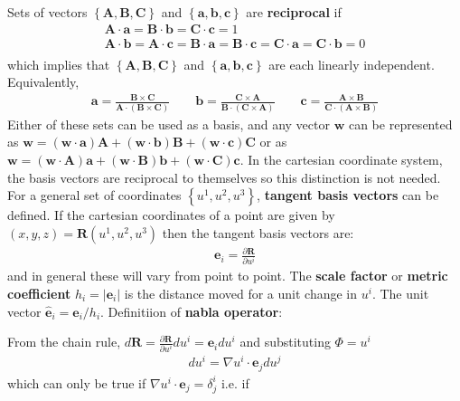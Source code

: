 \documentclass[12pt]{article}
\def\L{\left}
\def\R{\right}
\newcommand{\ve}[1]{\ensuremath{\boldsymbol{#1}}}
\newcommand{\hv}[1]{\hat{\ve{#1}}}
\newcommand{\bvec}{\ve{b}}
\newcommand{\Bvec}{\ve{B}}
\begin{document}
Sets of vectors $\L\{\mathbf{A, B, C}\R\}$ and $\L\{\mathbf{a, b,
c}\R\}$ are {\bf reciprocal} if
%
\begin{align*}
\mathbf{A\cdot a} = \mathbf{B\cdot b} = \mathbf{C\cdot c} = 1\\ \mathbf{A\cdot
b} = \mathbf{A\cdot c} = \mathbf{B\cdot a} = \mathbf{B\cdot c} = \mathbf{C\cdot
a} = \mathbf{C\cdot b} = 0 \\
\end{align*}
%
which implies that $\L\{\mathbf{A, B, C}\R\}$ and $\L\{\mathbf{a, b,
c}\R\}$ are each linearly independent.  Equivalently,
%
\begin{align*}
\mathbf{a} = \frac{\mathbf{B\times C}}{\mathbf{A\cdot\L(B\times
C\R)}}\qquad \bvec = \frac{\mathbf{C\times A}}{\mathbf{B\cdot\L(C\times
A\R)}}\qquad \mathbf{c} = \frac{\mathbf{A\times
B}}{\mathbf{C\cdot\L(A\times B\R)}}
\end{align*}
%
Either of these sets can be used as a basis, and any vector $\mathbf{w}$ can be
represented as $\mathbf{w} = \L(\mathbf{w\cdot a}\R)\mathbf{A} +
\L(\mathbf{w\cdot b}\R)\Bvec + \L(\mathbf{w\cdot c}\R)\mathbf{C}$
or as $\mathbf{w} = \L(\mathbf{w\cdot A}\R)\mathbf{a} +
\L(\mathbf{w\cdot B}\R)\bvec + \L(\mathbf{w\cdot
C}\R)\mathbf{c}$. In the cartesian coordinate system, the basis vectors are
reciprocal to themselves so this distinction is not needed.  For a general set
of coordinates $\L\{u^1, u^2, u^3\R\}$, {\bf tangent basis vectors} can
be defined. If the cartesian coordinates of a point are given by $\L(x, y,
z\R) = \mathbf{R}\L(u^1, u^2, u^3\R)$ then the tangent basis vectors
are:
%
\begin{align*}
\ve{e}_i = \frac{\partial\mathbf{R}}{\partial u^i}
\end{align*}
%
and in general these will vary from point to point. The {\bf scale factor} or
{\bf metric coefficient} $h_i =\L|\ve{e}_i\R| $ is the distance moved
for a unit change in $u^i$. The unit vector $\hv{e}_i = \ve{e}_i/h_i$.
Definitiion of {\bf nabla operator}:
%
\begin{center}
\end{center}
%
From the chain rule, $d\mathbf{R} = \frac{\partial\mathbf{R}}{\partial u^i}du^i
= \ve{e}_idu^i$ and substituting $\Phi = u^i$
%
\begin{align*}
du^i = \nabla u^i\cdot\ve{e}_jdu^j
\end{align*}
%
which can only be true if $\nabla u^i\cdot\ve{e}_j = \delta^i_j$ i.e. if
\end{document}
